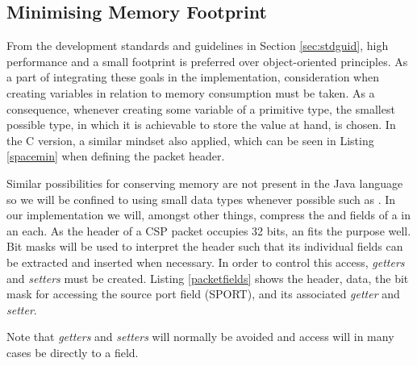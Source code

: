 \subsection{Minimising Memory Footprint} %
\label{sub:minimizing_memory_footprint}
From the development standards and guidelines in Section \ref{sec:stdguid}, high performance and a small footprint is preferred over object-oriented principles. As a part of integrating these goals in the implementation, consideration when creating variables in relation to memory consumption must be taken. As a consequence, whenever creating some variable of a primitive type, the smallest possible type, in which it is achievable to store the value at hand, is chosen. In the C version, a similar mindset also applied, which can be seen in Listing \ref{spacemin} when defining the packet header.



Similar possibilities for conserving memory are not present in the Java language so we will be confined to using small data types whenever possible such as . In our implementation we will, amongst other things, compress the  and  fields of a  in an  each. As the header of a CSP packet occupies 32 bits, an  fits the purpose well. Bit masks will be used to interpret the header such that its individual fields can be extracted and inserted when necessary. In order to control this access, \textit{getters} and \textit{setters} must be created. Listing \ref{packetfields} shows the header, data, the bit mask for accessing the source port field (SPORT), and its associated \textit{getter} and \textit{setter}.



Note that \textit{getters} and \textit{setters} will normally be avoided and access will in many cases be directly to a  field. 
